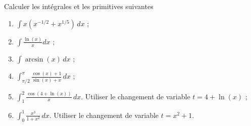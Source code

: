 
\begin{exercice}\label{exosession2-0002}

Calculer les intégrales et les primitives suivantes

  \begin{enumerate}
  \item $\displaystyle \int x(x^{-1/2} + x^{1/5})\, dx$ ;
  \item $\displaystyle \int \frac{\ln(x)}{x} dx$ ;
  \item $\displaystyle \int \arcsin(x)\, dx$ ;
  \item $\displaystyle \int_{\pi/2}^{\pi}\frac{\cos(x)+1}{\sin(x)+x }\, dx$ ; 
  \item $\displaystyle \int_{1}^{2}\frac{\cos(4+\ln(x))}{x}\, dx$. Utiliser le changement de variable $t = 4+\ln(x)$  ; 
  \item $\displaystyle \int_{0}^{1}\frac{x^3}{1+x^2}\, dx$. Utiliser le changement de variable $t = x^2 +1$. 
  \end{enumerate}

\end{exercice}

